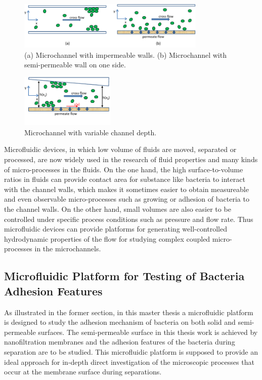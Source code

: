 \begin{figure}[ht]%
\centering
\includegraphics[width=0.8\textwidth]{figures/introduction/figure1_1}%
\caption{(a) Microchannel with impermeable walls. (b) Microchannel with semi-permeable wall on one side.}%
\label{figure1_1}%
\end{figure}

\begin{figure}[ht]%
\centering
\includegraphics[width=0.4\textwidth]{figures/introduction/figure1_2}%
\caption{Microchannel with variable channel depth.}%
\label{figure1_2}%
\end{figure}

Microfluidic devices, in which low volume of fluids are moved, separated or processed, are now widely used in the research of fluid properties and many kinds of micro-processes in the fluids. On the one hand, the high surface-to-volume ratios in fluids can provide contact area for substance like bacteria to interact with the channel walls, which makes it sometimes easier to obtain measureable and even observable micro-processes such as growing or adhesion of bacteria to the channel walls. On the other hand, small volumes are also easier to be controlled under specific process conditions such as pressure and flow rate. Thus microfluidic devices can provide platforms for generating well-controlled hydrodynamic properties of the flow for studying complex coupled micro-processes in the microchannels. 


\subsection{Microfluidic Platform for Testing of Bacteria Adhesion Features}
\label{1_1_1}
As illustrated in the former section, in this master thesis a microfluidic platform is designed to study the adhesion mechanism of bacteria on both solid and semi-permeable surfaces. The semi-permeable surface in this thesis work is achieved by nanofiltration membranes and the adhesion features of the bacteria during separation are to be studied. This microfluidic platform is supposed to provide an ideal approach for in-depth direct investigation of the microscopic processes that occur at the membrane surface during separations. 

